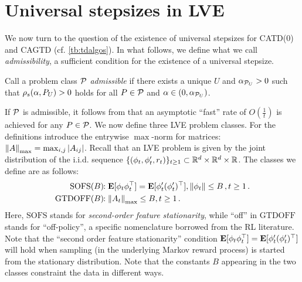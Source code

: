 \section{Universal stepsizes in LVE}\label{sec:rl}
We now turn to the question of the existence of universal stepsizes for CATD(0) and CAGTD (cf. \cref{tb:tdalgos}). 
In what follows, we define what we call \emph{admissibility}, 
a sufficient condition for the existence of a universal stepsize. 
\begin{definition}\label{def:admis}
Call a problem class $\P$ \emph{admissible} if there exists a unique $U$ and $\alpha_{\P_U}>0$ such that
$\rhos{P_U}>0$ holds for all $P\in \P$ and $\alpha\in(0,\alpha_{\P_U})$.
\end{definition}
If $\P$ is admissible, it  follows from  that an asymptotic ``fast'' rate of $O(\frac1t)$ is achieved for any $P\in \cP$. 
We now define three LVE problem classes. For the definitions introduce
the entrywise $\max$-norm for matrices: $\norm{A}_{\max} = \max_{i,j} |A_{ij}|$.
Recall that an LVE problem is given by the joint distribution of the i.i.d. sequence
$\{(\phi_t,\phi_t',r_t)\}_{t\ge 1}\subset \R^d\times \R^d \times \R$. 
The classes we define are as follows:
\begin{align*}
\text{SOFS}(B)&\!\!: \E[\phi_t\phi_t^\top]=\E[\phi'_t(\phi'_t)^\top], %
						\norm{\phi_t}\le B\,, t\ge 1\,.\\
\text{GTDOFF}(B)&\!\!:  \norm{A_t}_{\max} \le B, t\ge 1\,.
\end{align*}
Here, $\text{SOFS}$ stands for \emph{second-order feature stationarity}, 
while ``off'' in $\text{GTDOFF}$ stands for ``off-policy'', a specific nomenclature borrowed from the RL literature.
Note that the ``second order feature stationarity'' condition $\E[\phi_t\phi_t^\top]=\E[\phi'_t(\phi'_t)^\top]$ will hold 
when sampling (in the underlying Markov reward process) 
is started from the stationary distribution. 
Note that the constants $B$ appearing in the two classes constraint the data in different ways.
\FloatBarrier
